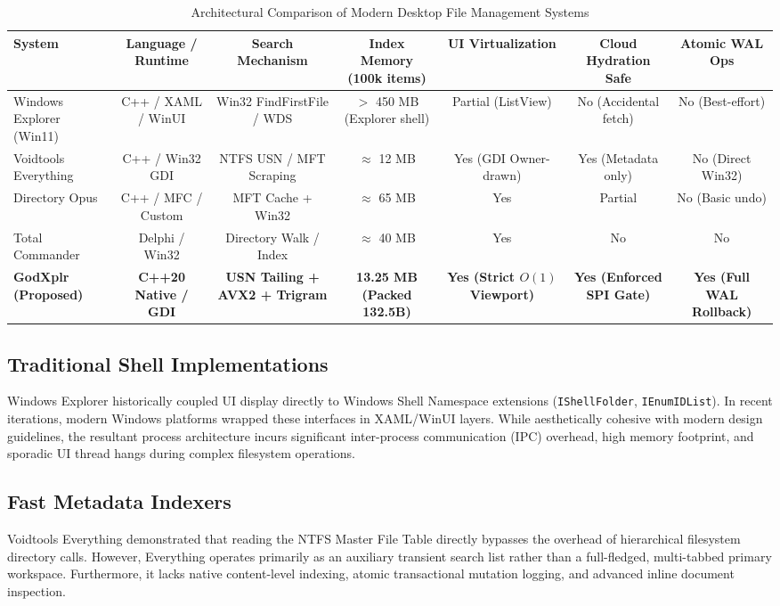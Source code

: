 \documentclass[conference]{IEEEtran}
\begin{document}
\begin{table}[t]
\caption{Architectural Comparison of Modern Desktop File Management Systems}
\label{tab:comparison}
\centering
\begin{tabular}{lcccccc}
\toprule
\textbf{System} & \textbf{Language / Runtime} & \textbf{Search Mechanism} & \textbf{Index Memory (100k items)} & \textbf{UI Virtualization} & \textbf{Cloud Hydration Safe} & \textbf{Atomic WAL Ops} \\
\midrule
Windows Explorer (Win11) & C++ / XAML / WinUI & Win32 FindFirstFile / WDS & $>$ 450 MB (Explorer shell) & Partial (ListView) & No (Accidental fetch) & No (Best-effort) \\
Voidtools Everything & C++ / Win32 GDI & NTFS USN / MFT Scraping & $\approx$ 12 MB & Yes (GDI Owner-drawn) & Yes (Metadata only) & No (Direct Win32) \\
Directory Opus & C++ / MFC / Custom & MFT Cache + Win32 & $\approx$ 65 MB & Yes & Partial & No (Basic undo) \\
Total Commander & Delphi / Win32 & Directory Walk / Index & $\approx$ 40 MB & Yes & No & No \\
\textbf{GodXplr (Proposed)} & \textbf{C++20 Native / GDI} & \textbf{USN Tailing + AVX2 + Trigram} & \textbf{13.25 MB (Packed 132.5B)} & \textbf{Yes (Strict $O(1)$ Viewport)} & \textbf{Yes (Enforced SPI Gate)} & \textbf{Yes (Full WAL Rollback)} \\
\bottomrule
\end{tabular}
\end{table}

\subsection{Traditional Shell Implementations}
Windows Explorer historically coupled UI display directly to Windows Shell Namespace extensions (\texttt{IShellFolder}, \texttt{IEnumIDList}). In recent iterations, modern Windows platforms wrapped these interfaces in XAML/WinUI layers. While aesthetically cohesive with modern design guidelines, the resultant process architecture incurs significant inter-process communication (IPC) overhead, high memory footprint, and sporadic UI thread hangs during complex filesystem operations.

\subsection{Fast Metadata Indexers}
Voidtools Everything demonstrated that reading the NTFS Master File Table directly bypasses the overhead of hierarchical filesystem directory calls. However, Everything operates primarily as an auxiliary transient search list rather than a full-fledged, multi-tabbed primary workspace. Furthermore, it lacks native content-level indexing, atomic transactional mutation logging, and advanced inline document inspection.
\end{document}
